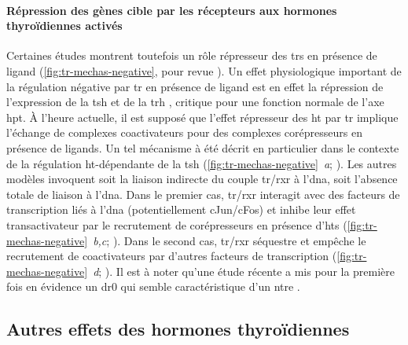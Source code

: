 \documentclass[../main.tex]{subfiles}
\begin{document}


\paragraph{Répression des gènes cible par les récepteurs aux hormones thyroïdiennes activés}
Certaines études montrent toutefois un rôle répresseur des \glspl{tr} en présence de ligand (\autoref{fig:tr-mechas-negative}, pour revue \citealp{Lazar2003,Weitzel2008}).
Un effet physiologique important de la régulation négative par \gls{tr} en présence de ligand est en effet la répression de l'expression de la \gls{tsh} et de la \gls{trh} \citep{Dupre2004}, critique pour une fonction normale de l'axe \gls{hpt}.
À l'heure actuelle, il est supposé que l'effet répresseur des \gls{ht} par \gls{tr} implique l'échange de complexes coactivateurs pour des complexes corépresseurs en présence de ligands.
Un tel mécanisme à été décrit en particulier dans le contexte de la régulation \gls{ht}-dépendante de la \gls{tsh} (\autoref{fig:tr-mechas-negative}~\textit{a}; \citealp{Sasaki1999}).
Les autres modèles invoquent soit la liaison indirecte du couple \gls{tr}/\gls{rxr} à l'\gls{dna}, soit l'absence totale de liaison à l'\gls{dna}.
Dans le premier cas, \gls{tr}/\gls{rxr} interagit avec des facteurs de transcription liés à l'\gls{dna} (potentiellement cJun/cFos) et inhibe leur effet transactivateur par le recrutement de corépresseurs en présence d'\glspl{ht} (\autoref{fig:tr-mechas-negative}~\textit{b,c}; \citealp{Matsushita2007}).
Dans le second cas, \gls{tr}/\gls{rxr} séquestre et empêche le recrutement de coactivateurs par d'autres facteurs de transcription (\autoref{fig:tr-mechas-negative}~\textit{d}; \citealp{Wulf2008}).
Il est à noter qu'une étude récente a mis pour la première fois en évidence un \gls{dr0} qui semble caractéristique d'un \gls{ntre} \citep{Ramadoss2014}.




\subsection{Autres effets des hormones thyroïdiennes}
\end{document}
